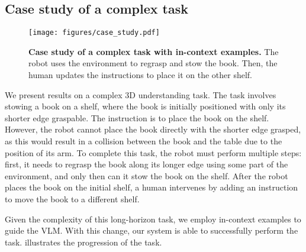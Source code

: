 \subsection{Case study of a complex task}
\begin{figure}[h]
    \setlength{\abovecaptionskip}{0pt}
    \texttt{[image: figures/case\_study.pdf]}
    \caption{\small{\textbf{Case study of a complex task with in-context examples.} The robot uses the environment to regrasp and stow the book. Then, the human updates the instructions to place it on the other shelf.}}
    \label{fig:case_study}
\end{figure}

We present results on a complex 3D understanding task. The task involves stowing a book on a shelf, where the book is initially positioned with only its shorter edge graspable. The instruction is to place the book on the shelf. However, the robot cannot place the book directly with the shorter edge grasped, as this would result in a collision between the book and the table due to the position of its arm. To complete this task, the robot must perform multiple steps: first, it needs to regrasp the book along its longer edge using some part of the environment, and only then can it stow the book on the shelf. After the robot places the book on the initial shelf, a human intervenes by adding an instruction to move the book to a different shelf.


Given the complexity of this long-horizon task, we employ in-context examples to guide the VLM. With this change,  our system is able to successfully perform the task.  illustrates the progression of the task.

